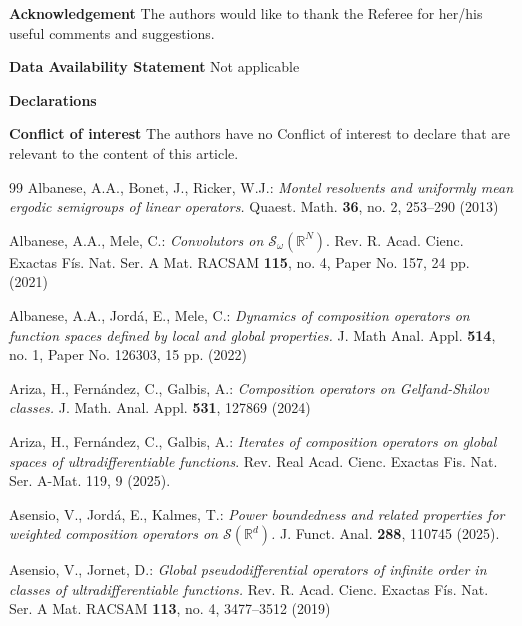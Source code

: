 \documentclass[12pt,reqno]{amsart} %
\numberwithin{equation}{section}
\begin{document}
				\medskip
				\noindent
				\textbf{Acknowledgement} The authors would like to thank the Referee for her/his useful
				comments and suggestions.
				
				
				
				\medskip
				\noindent
				\textbf{Data Availability Statement} Not applicable
				\medskip
				
				
				\noindent
				{\textbf{Declarations }}
				
				\medskip
				\noindent
				\textbf{Conflict of interest}
				 The authors have no Conflict of interest to declare that	are relevant to the content of this article.
				
				\begin{thebibliography}{99}
					  Albanese, A.A.,   Bonet, J.,   Ricker, W.J.: \emph{Montel resolvents and uniformly mean ergodic semigroups of linear operators.} Quaest. Math. {\bf 36}, no. 2, 253--290 (2013)
					
					  Albanese, A.A., Mele, C.: \emph{Convolutors on  ${\mathcal S}_\omega(
						{\mathbb R}^N).$} Rev. R. Acad. Cienc. Exactas F\'is. Nat. Ser. A Mat. RACSAM {\bf 115}, no. 4, Paper No. 157, 24 pp. (2021)
					
					  Albanese, A.A.,  Jord\'a, E.,  Mele, C.: \emph{Dynamics of composition operators
						on function spaces defined by local and global properties.} J. Math Anal. Appl.
					{\bf 514}, no. 1, Paper No. 126303, 15 pp. (2022)
					
					
					
					  Ariza, H.,   Fern\'andez, C.,   Galbis, A.: {\em Composition operators on Gelfand-Shilov classes.} J. Math. Anal. Appl. {\bf 531}, 127869 (2024)
					
					  Ariza, H.,   Fern\'andez, C.,   Galbis, A.: {\em Iterates of composition operators on global spaces of ultradifferentiable functions}. Rev. Real Acad. Cienc. Exactas Fis. Nat. Ser. A-Mat. 119, 9 (2025).
					
					 Asensio, V., Jord\'a, E.,  Kalmes, T.: \emph{Power boundedness and related properties for weighted composition operators on $\mathcal{S}(\mathbb{R}^d)$.} J. Funct. Anal. {\bf 288}, 110745 (2025).
					
					  Asensio, V.,  Jornet, D.: \emph{ Global pseudodifferential operators of infinite order in classes of ultradifferentiable functions.} Rev. R. Acad. Cienc. Exactas F\'is. Nat. Ser. A Mat. RACSAM {\bf 113}, no. 4, 3477--3512 (2019)
					

\end{thebibliography}
\end{document}
